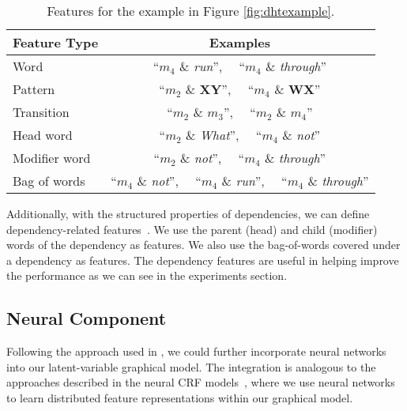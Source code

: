 \begin{table}[t!]
	\centering
		\begin{tabular}{lc}
			\toprule
			Feature Type & Examples \\
			\midrule
			\midrule
			Word &  ``$m_4$ \& {\em run}'', ~~``$m_4$ \& {\em through}'' \\
			Pattern & ``$m_2$ \& $\mathbf{XY}$'', ~~``$m_4$ \& $\mathbf{WX}$'' \\
			Transition & ``$m_2$ \& $m_3$'', ~~``$m_2$ \& $m_4$'' \\
			\midrule
			\midrule 
			Head word & ``$m_2$ \& {\em What}'', ~~``$m_4$ \& {\em not}'' \\
			Modifier word & ``$m_2$ \& {\em not}'', ~~``$m_4$ \& {\em through}'' \\
			Bag of words & ``$m_4$ \& {\em not}'', ~~``$m_4$ \& {\em run}'', ~~``$m_4$ \& {\em through}'' \\
			\bottomrule 
		\end{tabular}
	\caption{Features for the example in Figure \ref{fig:dhtexample}. 
	}
	\label{tab:features}
\end{table}

Additionally, with the structured properties of dependencies, we can define dependency-related features~\cite{mcdonald2005online}. 
We use the parent (head) and child (modifier) words of the dependency as features.
We also use the bag-of-words covered under a dependency as features. 
The dependency features are useful in helping improve the performance as we can see in the experiments section. 



\subsection{Neural Component}

Following the approach used in \citet{susanto2017semantic}, we could further incorporate  neural networks into our latent-variable graphical model. 
The integration is analogous to the approaches described in the neural CRF models~\cite{artieres2010neural,durrett2015neural,gormley2015graphical,lample2016neural},
where we use neural networks to learn distributed feature representations within our graphical model.

